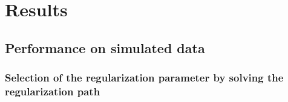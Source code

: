 
\section{Results}


\subsection{Performance on simulated data}
\subsubsection{Selection of the regularization parameter by solving the regularization path}
\label{sec:regpath}

